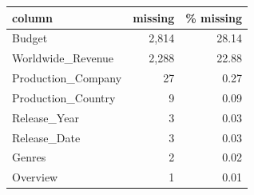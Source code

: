 \begin{tabular}{lrr}
\toprule
column & missing & \% missing \\
\midrule
Budget & 2{,}814 & 28.14 \\
Worldwide\_Revenue & 2{,}288 & 22.88 \\
Production\_Company & 27 & 0.27 \\
Production\_Country & 9 & 0.09 \\
Release\_Year & 3 & 0.03 \\
Release\_Date & 3 & 0.03 \\
Genres & 2 & 0.02 \\
Overview & 1 & 0.01 \\
\bottomrule
\end{tabular}
